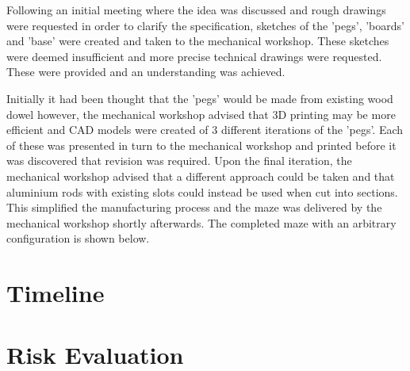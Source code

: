 Following an initial meeting where the idea was discussed and 
rough drawings were requested in order to clarify the 
specification, sketches of the 'pegs', 'boards' and 'base' were 
created and taken to the mechanical workshop. These sketches 
were deemed insufficient and more precise technical drawings 
were requested. These were provided and an understanding was 
achieved. 

Initially it had been thought that the 'pegs' would be made from 
existing wood dowel however, the mechanical workshop advised 
that 3D printing may be more efficient and CAD models were 
created of 3 different iterations of the 'pegs'. Each of these 
was presented in turn to the mechanical workshop and printed 
before it was discovered that revision was required. Upon the 
final iteration, the mechanical workshop advised that a 
different approach could be taken and that aluminium rods with 
existing slots could instead be used when cut into sections. 
This simplified the manufacturing process and the maze was 
delivered by the mechanical workshop shortly afterwards. The 
completed maze with an arbitrary configuration is shown below.



\section{Timeline}\label{pm/timeline}



\section{Risk Evaluation}\label{pm/riskeval}

